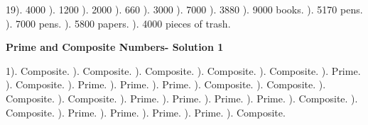 \documentclass{article}%
\begin{document}
19). 4000%
). 1200%
). 2000%
). 660%
). 3000%
). 7000%
). 3880%
). 9000 books.%
). 5170 pens.%
). 7000 pens.%
). 5800 papers.%
). 4000 pieces of trash.%
\newline%
\newpage%
\large%
\begin{center}%
\textbf{Prime and Composite Numbers- Solution 1}%
\newline%
\end{center} \normalsize%
1). Composite.%
). Composite.%
). Composite.%
). Composite.%
). Composite.%
). Prime.%
). Composite.%
). Prime.%
). Prime.%
). Prime.%
). Composite.%
). Composite.%
). Composite.%
). Composite.%
). Prime.%
). Prime.%
). Prime.%
). Prime.%
). Composite.%
). Composite.%
). Prime.%
). Prime.%
). Prime.%
). Prime.%
). Composite.%
\newline%
\end{document}

